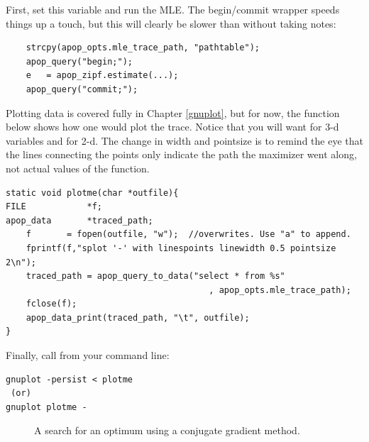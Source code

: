 First, set this variable and run the MLE. The begin/commit wrapper
speeds things up a touch, but this will clearly be slower than without
taking notes:
\begin{lstlisting}
    strcpy(apop_opts.mle_trace_path, "pathtable");
    apop_query("begin;");
    e   = apop_zipf.estimate(...);
    apop_query("commit;");
\end{lstlisting}
Plotting data is covered fully in Chapter \ref{gnuplot}, but for now,
the function below shows how one would plot the trace.  Notice that
you will want  for 3-d variables and  for
2-d. The change in width and pointsize is to remind the eye that the
lines connecting the points only indicate the path the maximizer went
along, not actual values of the function.

\begin{lstlisting}
static void plotme(char *outfile){
FILE            *f;
apop_data       *traced_path;
    f       = fopen(outfile, "w");  //overwrites. Use "a" to append.
    fprintf(f,"splot '-' with linespoints linewidth 0.5 pointsize 2\n");
    traced_path = apop_query_to_data("select * from %s"
                                        , apop_opts.mle_trace_path);
    fclose(f);
    apop_data_print(traced_path, "\t", outfile);
}
\end{lstlisting}

Finally, call  from your command line:
\begin{lstlisting}
gnuplot -persist < plotme
 (or)
gnuplot plotme -
\end{lstlisting}

\begin{figure}
\caption{A search for an optimum using a conjugate gradient method.}
\end{figure}

